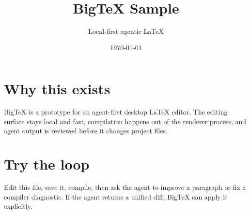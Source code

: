 \documentclass[11pt]{article}
\title{BigTeX Sample}
\author{Local-first agentic LaTeX}
\date{\today}
\begin{document}
\maketitle

\section{Why this exists}

BigTeX is a prototype for an agent-first desktop LaTeX editor. The editing
surface stays local and fast, compilation happens out of the renderer process,
and agent output is reviewed before it changes project files.

\section{Try the loop}

Edit this file, save it, compile, then ask the agent to improve a paragraph or
fix a compiler diagnostic. If the agent returns a unified diff, BigTeX can
apply it explicitly.
\end{document}
